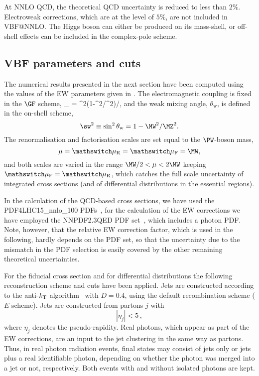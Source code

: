 At NNLO QCD, the theoretical QCD uncertainty is reduced to less than
$2\%$. Electroweak corrections, which are at the level of $5\%$, are
not included in {\sc VBF@NNLO}.
%
The Higgs boson can either be produced on its mass-shell, or off-shell effects can be included in the
complex-pole scheme.


\subsection{VBF parameters and cuts}
\label{sec:VBFcuts-sub}

The numerical results presented in the next section have been
computed using the values of the EW parameters given in .
The electromagnetic coupling is fixed in the
$\GF$ scheme, 
\beq
 \alpha_{\GF} = \GF\MW^2(1-\MW^2/\MZ^2)/\pi,
\eeq
and the weak mixing angle, $\theta_{\mathrm{w}}$, is defined in the on-shell scheme,
\begin{equation}
\sw^2\equiv\sin^2\theta_{\mathrm{w}}=1-\MW^2/\MZ^2.
\end{equation}
The renormalisation and factorisation scales are set equal to the
$\PW$-boson mass,
\begin{equation}
\label{eq:VBF_ren_fac_scales}
\mu = \muR = \muF= \MW,
\end{equation}
and both scales are varied in the range $\MW/2 < \mu < 2\MW$ keeping $\muF=\muR$,
which catches the full scale uncertainty of integrated cross sections
(and of differential distributions in the essential regions).

In the calculation of the QCD-based cross sections, we have used the
PDF4LHC15\_nnlo\_100 PDFs~\cite{Butterworth:2015oua}, for the calculation of the EW corrections we have employed
the NNPDF2.3QED PDF set~\cite{Ball:2013hta}, which includes a photon PDF. 
%
Note, however, that the relative EW correction factor, which is used in the following,
hardly depends on the PDF set, so that the uncertainty due to the
mismatch in the PDF selection is easily covered by the other remaining
theoretical uncertainties.

For the fiducial cross section and for 
differential distributions the following reconstruction scheme
and cuts have been applied.
Jets are constructed according to the anti-$k\sb{\scriptstyle\mathrm{T}}$ algorithm~\cite{Cacciari:2008gp} with
$D=0.4$, using the default
recombination scheme ($E$ scheme).  Jets are constructed from partons $j$ with
\begin{equation}
\label{eq:VBF_cuts1}
|\eta_j| < 5\,,
\end{equation}
where $\eta_j$ denotes the pseudo-rapidity.  Real photons, which
appear as part of the EW corrections, are an input to the jet
clustering in the same way as partons.  
Thus, in real photon radiation events, final states may consist of jets
only or jets plus a real identifiable photon, depending on whether 
the photon was merged into a jet or not, respectively. 
Both events with and without isolated photons are kept.

